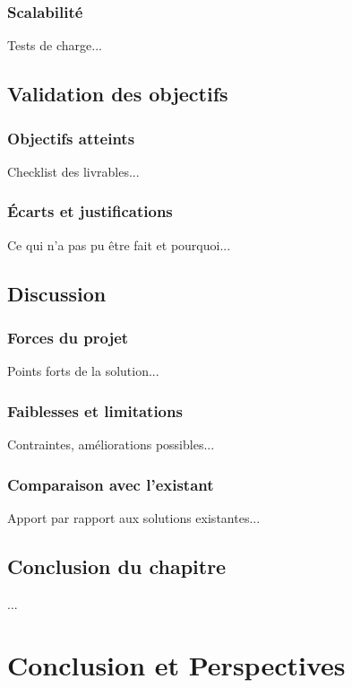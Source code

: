 \documentclass[12pt,a4paper]{report}
\begin{document}
\subsection{Scalabilité}
Tests de charge...

\section{Validation des objectifs}
\subsection{Objectifs atteints}
Checklist des livrables...

\subsection{Écarts et justifications}
Ce qui n'a pas pu être fait et pourquoi...

\section{Discussion}
\subsection{Forces du projet}
Points forts de la solution...

\subsection{Faiblesses et limitations}
Contraintes, améliorations possibles...

\subsection{Comparaison avec l'existant}
Apport par rapport aux solutions existantes...

\section{Conclusion du chapitre}
...

\chapter{Conclusion et Perspectives}
\label{chap:conclusion}
\end{document}
